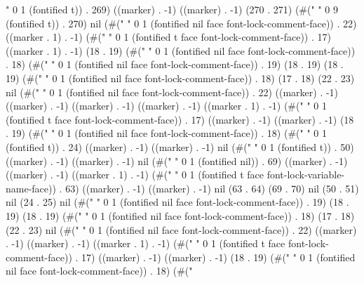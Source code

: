 {" 0 1 (fontified t)) . 269) ((marker) . -1) ((marker) . -1) (270 . 271) (#("         " 0 9 (fontified t)) . 270) nil (#("
" 0 1 (fontified nil face font-lock-comment-face)) . 22) ((marker . 1) . -1) (#("
" 0 1 (fontified t face font-lock-comment-face)) . 17) ((marker . 1) . -1) (18 . 19) (#("
" 0 1 (fontified nil face font-lock-comment-face)) . 18) (#("%
" 0 1 (fontified nil face font-lock-comment-face)) . 19) (18 . 19) (18 . 19) (#(" " 0 1 (fontified nil face font-lock-comment-face)) . 18) (17 . 18) (22 . 23) nil (#("
" 0 1 (fontified nil face font-lock-comment-face)) . 22) ((marker) . -1) ((marker) . -1) ((marker) . -1) ((marker) . -1) ((marker . 1) . -1) (#("
" 0 1 (fontified t face font-lock-comment-face)) . 17) ((marker) . -1) ((marker) . -1) (18 . 19) (#("
" 0 1 (fontified nil face font-lock-comment-face)) . 18) (#("%
" 0 1 (fontified t)) . 24) ((marker) . -1) ((marker) . -1) nil (#("
" 0 1 (fontified t)) . 50) ((marker) . -1) ((marker) . -1) nil (#("
" 0 1 (fontified nil)) . 69) ((marker) . -1) ((marker) . -1) ((marker . 1) . -1) (#("
" 0 1 (fontified t face font-lock-variable-name-face)) . 63) ((marker) . -1) ((marker) . -1) nil (63 . 64) (69 . 70) nil (50 . 51) nil (24 . 25) nil (#("
" 0 1 (fontified nil face font-lock-comment-face)) . 19) (18 . 19) (18 . 19) (#(" " 0 1 (fontified nil face font-lock-comment-face)) . 18) (17 . 18) (22 . 23) nil (#("
" 0 1 (fontified nil face font-lock-comment-face)) . 22) ((marker) . -1) ((marker) . -1) ((marker . 1) . -1) (#("
" 0 1 (fontified t face font-lock-comment-face)) . 17) ((marker) . -1) ((marker) . -1) (18 . 19) (#("
" 0 1 (fontified nil face font-lock-comment-face)) . 18) (#("%
}
